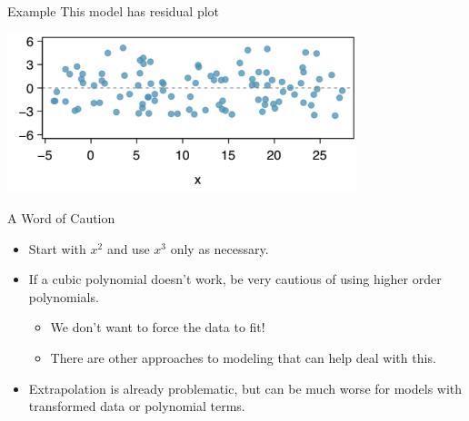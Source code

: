 \begin{frame}{Example}
    This model has residual plot
    \vspace{18pt}\begin{center}
        \includegraphics[width=4in]{images/nonlindataresid.png}
    \end{center}
\end{frame}

\begin{frame}{A Word of Caution}
    \begin{itemize}
        \item Start with $x^2$ and use $x^3$ only as necessary.
        \item If a cubic polynomial doesn't work, be very cautious of using higher order polynomials.
        \begin{itemize}
            \item We don't want to force the data to fit!
            \item There are other approaches to modeling that can help deal with this.
        \end{itemize}
        \item Extrapolation is already problematic, but can be much worse for models with transformed data or polynomial terms.
    \end{itemize}
\end{frame}
